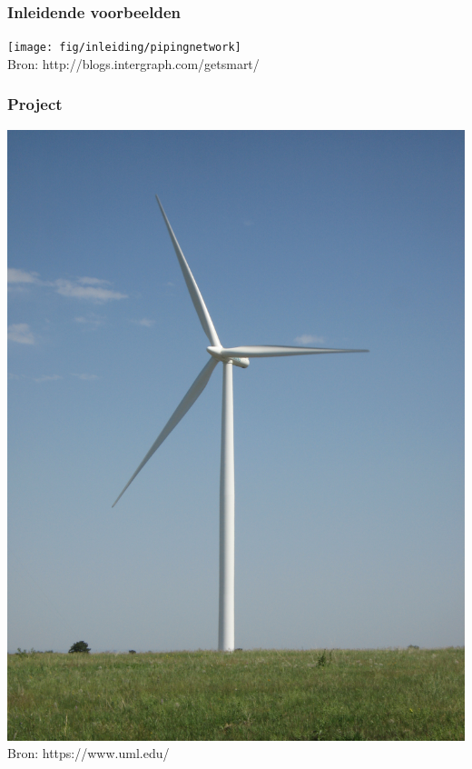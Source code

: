 \documentclass[t]{beamer}
\begin{document}
	\begin{frame}
		\frametitle{Inleidende voorbeelden}
		\center
    	\texttt{[image: fig/inleiding/pipingnetwork]}\\
    	\footnotesize{Bron: http://blogs.intergraph.com/getsmart/}
  	\end{frame}
	\begin{frame}
		\frametitle{Project}
		\center
    	\includegraphics[height=0.8\textheight]{fig/inleiding/wind_turbine_tcm18-88992}\\
    	\footnotesize{Bron: https://www.uml.edu/}
  	\end{frame}  	
\end{document}
